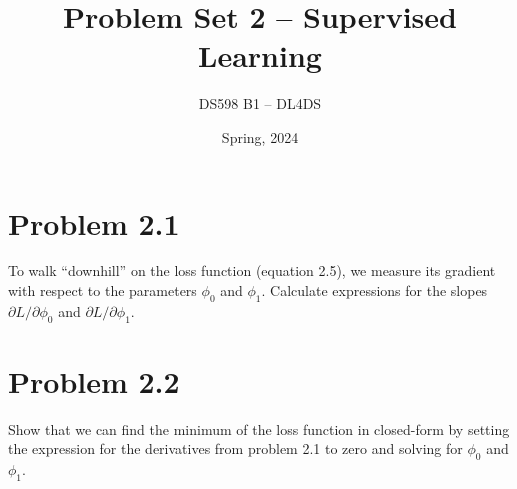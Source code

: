\documentclass[11pt, oneside]{article}   	%
\title{Problem Set 2 -- Supervised Learning}
\author{DS598 B1 -- DL4DS}
\date{Spring, 2024}							%
\begin{document}
\maketitle
\section*{Problem 2.1}

To walk “downhill” on the loss function (equation 2.5), we measure its gradient
with respect to the parameters \( \phi_0 \) and \( \phi_1 \).
Calculate expressions for the slopes \( \partial L / \partial \phi_0 \)
and \( \partial L / \partial \phi_1 \).

\vspace{5cm}

\section*{Problem 2.2}

Show that we can find the minimum of the loss function in closed-form by setting
the expression for the derivatives from problem 2.1 to zero and solving for
\( \phi_0 \) and \( \phi_1 \).
\end{document}
